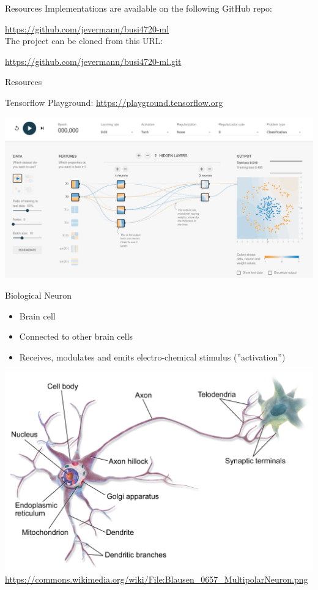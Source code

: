 \documentclass[ignorenonframetext,xcolor=x11names]{beamer}
\begin{document}
\begin{frame}{Resources}
Implementations are available on the following GitHub repo:

\url{https://github.com/jevermann/busi4720-ml} \\


The project can be cloned from this URL:

\url{https://github.com/jevermann/busi4720-ml.git}
\end{frame}

\begin{frame}{Resources}
\small

Tensorflow Playground: \url{https://playground.tensorflow.org}

\begin{center}
\includegraphics[width=.9\textwidth]{tensorflowplayground.png}
\end{center}


\end{frame}


\begin{frame}{Biological Neuron}
\begin{itemize}
  \item Brain cell
  \item Connected to other brain cells
  \item Receives, modulates and emits electro-chemical stimulus (''activation'')
\end{itemize}
\centering
\includegraphics[width=.7\textwidth]{Blausen_0657_MultipolarNeuron.png}
\scriptsize \url{https://commons.wikimedia.org/wiki/File:Blausen_0657_MultipolarNeuron.png}
\end{frame}
\end{document}
